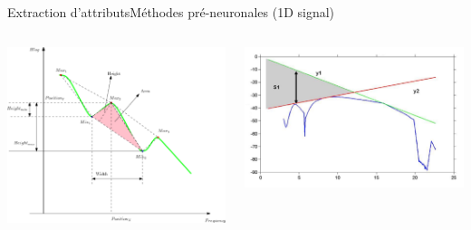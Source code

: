 \documentclass[compress]{beamer}
\begin{document}
\begin{frame}{Extraction d'attributs}{Méthodes pré-neuronales (1D signal)}
\begin{columns}
  \begin{column}{0.5\linewidth}
    \centering
    \includegraphics[width=0.9\linewidth]{resources/AA_exemple}
  \end{column}
  \begin{column}{0.5\linewidth}
    \centering
    \includegraphics[width=0.9\linewidth]{resources/CC_example}
  \end{column}
\end{columns}
\end{frame}
\end{document}
